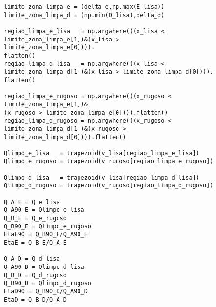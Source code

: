 \begin{lstlisting}[title=\phantom{}]
limite_zona_limpa_e = (delta_e,np.max(E_lisa))
limite_zona_limpa_d = (np.min(D_lisa),delta_d)

regiao_limpa_e_lisa   = np.argwhere(((x_lisa < 
limite_zona_limpa_e[1])&(x_lisa >
limite_zona_limpa_e[0]))).
flatten()
regiao_limpa_d_lisa   = np.argwhere(((x_lisa <
limite_zona_limpa_d[1])&(x_lisa > limite_zona_limpa_d[0]))).
flatten()

regiao_limpa_e_rugoso = np.argwhere(((x_rugoso < 
limite_zona_limpa_e[1])&
(x_rugoso > limite_zona_limpa_e[0]))).flatten()
regiao_limpa_d_rugoso = np.argwhere(((x_rugoso < 
limite_zona_limpa_d[1])&(x_rugoso > limite_zona_limpa_d[0]))).flatten()

Qlimpo_e_lisa   = trapezoid(v_lisa[regiao_limpa_e_lisa])
Qlimpo_e_rugoso = trapezoid(v_rugoso[regiao_limpa_e_rugoso])

Qlimpo_d_lisa   = trapezoid(v_lisa[regiao_limpa_d_lisa])
Qlimpo_d_rugoso = trapezoid(v_rugoso[regiao_limpa_d_rugoso])

Q_A_E = Q_e_lisa
Q_A90_E = Qlimpo_e_lisa
Q_B_E = Q_e_rugoso
Q_B90_E = Qlimpo_e_rugoso
EtaE90 = Q_B90_E/Q_A90_E
EtaE = Q_B_E/Q_A_E

Q_A_D = Q_d_lisa
Q_A90_D = Qlimpo_d_lisa
Q_B_D = Q_d_rugoso
Q_B90_D = Qlimpo_d_rugoso
EtaD90 = Q_B90_D/Q_A90_D
EtaD = Q_B_D/Q_A_D

\end{lstlisting}